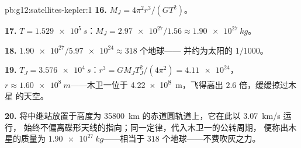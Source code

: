 \begin{solution}{pb:g12:satellites-kepler:1}
\textbf{16.} $M_J = 4\pi^2 r^3/(G T^2)$。

\textbf{17.} $T = \qty{1.529e5}{s}$：$M_J =
\num{2.97e27}/1.56 \approx \qty{1.90e27}{kg}$。

\textbf{18.} $\num{1.90e27}/\num{5.97e24} \approx 318$ 个地球——
并约为太阳的 $1/1000$。

\textbf{19.} $T_J = \qty{3.576e4}{s}$：$r^3 = GM_J T_J^2/(4\pi^2) =
\num{4.11e24}$，$r \approx \qty{1.60e8}{m}$——木卫一位于
\qty{4.22e8}{m}，飞得高出 $2.6$ 倍，缓缓掠过木星
的天空。

\textbf{20.} 将中继站放置于高度为
\qty{35800}{km} 的赤道圆轨道上，它在此以 \qty{3.07}{km/s} 运行，
始终不偏离碟形天线的指向；同一定律，代入木卫一的公转周期，
便称出木星的质量为 $\qty{1.90e27}{kg}$——相当于 $318$ 个地球——不费吹灰之力。
\end{solution}
